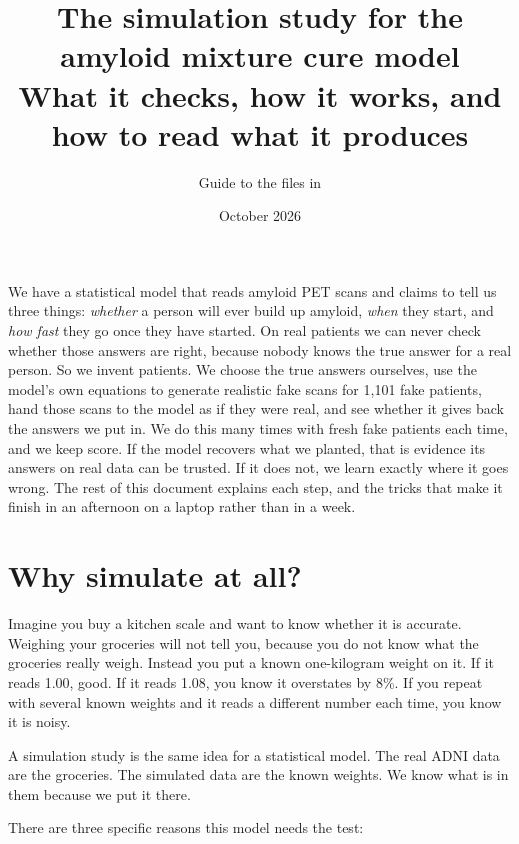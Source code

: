\documentclass[11pt]{article}
\title{\textbf{The simulation study for the amyloid mixture cure model}\\[4pt]
\large What it checks, how it works, and how to read what it produces}
\author{Guide to the files in \code{simulation/}}
\date{October 2026}
\begin{document}
\maketitle

\begin{plain}
We have a statistical model that reads amyloid PET scans and claims to tell us three things: \emph{whether} a person will ever build up amyloid, \emph{when} they start, and \emph{how fast} they go once they have started. On real patients we can never check whether those answers are right, because nobody knows the true answer for a real person. So we invent patients. We choose the true answers ourselves, use the model's own equations to generate realistic fake scans for 1,101 fake patients, hand those scans to the model as if they were real, and see whether it gives back the answers we put in. We do this many times with fresh fake patients each time, and we keep score. If the model recovers what we planted, that is evidence its answers on real data can be trusted. If it does not, we learn exactly where it goes wrong. The rest of this document explains each step, and the tricks that make it finish in an afternoon on a laptop rather than in a week.
\end{plain}

\tableofcontents
\bigskip

\section{Why simulate at all?}

Imagine you buy a kitchen scale and want to know whether it is accurate. Weighing your groceries will not tell you, because you do not know what the groceries really weigh. Instead you put a known one-kilogram weight on it. If it reads 1.00, good. If it reads 1.08, you know it overstates by 8\%. If you repeat with several known weights and it reads a different number each time, you know it is noisy.

A simulation study is the same idea for a statistical model. The real ADNI data are the groceries. The simulated data are the known weights. We know what is in them because we put it there.

There are three specific reasons this model needs the test:
\end{document}

